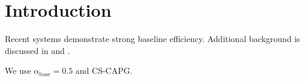 \section{Introduction}\label{sec:intro}

Recent systems \citep{greshake2023indirect} demonstrate strong baseline efficiency. Additional background is discussed in \citep{wu2025secagent} and \citep{miller2025unlistedsec}.

We use $\alpha_{\text{base}} = 0.5$ and CS-CAPG.
